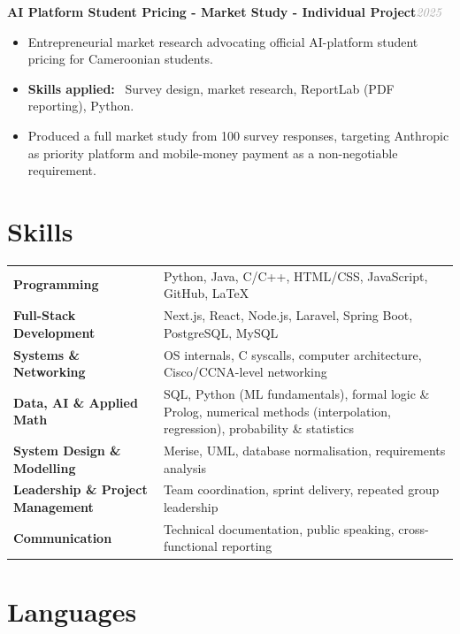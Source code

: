\documentclass[10pt, a4paper]{article}
\newcommand{\entryhead}[2]{%
  \noindent\textbf{#1}\hfill{\small\textit{\textcolor{darkgray}{#2}}}\\[-4pt]%
}
\newcommand{\blabel}[1]{\textbf{#1}\ }
\begin{document}
\vspace{4pt}
\entryhead{AI Platform Student Pricing - Market Study \normalfont\small- Individual Project}{2025}
\begin{itemize}
  \item Entrepreneurial market research advocating official AI-platform student pricing for
        Cameroonian students.
  \item \blabel{Skills applied:} Survey design, market research, ReportLab (PDF reporting),
        Python.
  \item Produced a full market study from 100 survey responses, targeting Anthropic as priority
        platform and mobile-money payment as a non-negotiable requirement.
\end{itemize}

\section{Skills}

\vspace{2pt}
\noindent
\begin{tabularx}{\linewidth}{@{} >{\bfseries}p{4.8cm} X @{}}
  Programming
    & Python, Java, C/C++, HTML/CSS, JavaScript, GitHub, \LaTeX \\[3pt]
  Full-Stack Development
    & Next.js, React, Node.js, Laravel, Spring Boot, PostgreSQL, MySQL \\[3pt]
  Systems \& Networking
    & OS internals, C syscalls, computer architecture, Cisco/CCNA-level networking \\[3pt]
  Data, AI \& Applied Math
    & SQL, Python (ML fundamentals), formal logic \& Prolog, numerical methods
      (interpolation, regression), probability \& statistics \\[3pt]
  System Design \& Modelling
    & Merise, UML, database normalisation, requirements analysis \\[3pt]
  Leadership \& Project Management
    & Team coordination, sprint delivery, repeated group leadership \\[3pt]
  Communication
    & Technical documentation, public speaking, cross-functional reporting \\
\end{tabularx}

\section{Languages}
\end{document}
